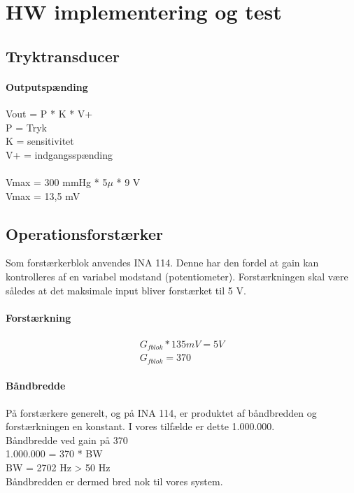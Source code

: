 \chapter{HW implementering og test}



\section{Tryktransducer}
\subsubsection{Outputspænding} 
Vout = P * K * V+
\\
P = Tryk\\K = sensitivitet\\V+ = indgangsspænding\\ \\

Vmax = 300 mmHg * 5$\mu$ * 9 V\\
Vmax = 13,5 mV


\section{Operationsforstærker}
Som forstærkerblok anvendes INA 114. Denne har den fordel at gain kan kontrolleres af en variabel modstand (potentiometer). Forstærkningen skal være således at det maksimale input bliver forstærket til 5 V. 
\subsubsection{Forstærkning}
\begin{align}
G_{fblok} * 135 mV = 5 V\\
G_{fblok} = 370	
\end{align}

\subsubsection{Båndbredde}
På forstærkere generelt, og på INA 114, er produktet af båndbredden og forstærkningen en konstant. I vores tilfælde er dette 1.000.000.\\
Båndbredde ved gain på 370\\
1.000.000 = 370 * BW\\
BW = 2702 Hz > 50 Hz\\
Båndbredden er dermed bred nok til vores system.

